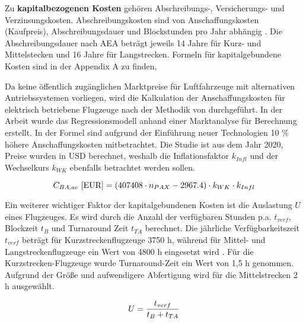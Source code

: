 Zu \textbf{kapitalbezogenen Kosten} gehören Abschreibungs-, Versicherungs- und Verzinsungskosten. 
Abschreibungskosten sind von Anschaffungskosten (Kaufpreis), Abschreibungsdauer und Blockstunden pro Jahr abhängig \cite{conrady2019luftverkehr}.
Die Abschreibungsdauer nach AEA beträgt jeweils 14 Jahre für Kurz- und Mittelstecken und 16 Jahre für Langstrecken.
Formeln für kapitalgebundene Kosten sind in der Appendix A zu finden,

Da keine öffentlich zugänglichen Marktpreise für Luftfahrzeuge mit alternativen Antriebssystemen vorliegen, 
wird die Kalkulation der Anschaffungskosten für elektrisch betriebene Flugzeuge nach der Methodik von \cite{monjon2020conceptual} durchgeführt. 
In der Arbeit wurde das Regressionsmodell anhand einer Marktanalyse für Berechnung erstellt. 
In der Formel sind aufgrund der Einführung neuer Technologien 10 \% höhere Anschaffungskosten mitbetrachtet. 
Die Studie ist aus dem Jahr 2020, Preise wurden in USD berechnet, weshalb die Inflationsfaktor $k_{Infl}$ und
der Wechselkurs $k_{WK}$ ebenfalls betrachtet werden sollen.

\begin{equation}
   {C_{BA,ac} ~[\text{EUR}]} = (407408 \cdot n_{PAX} - 2967.4) \cdot k_{WK} \cdot {k_{Infl}}\\
   \label{price BA}
\end{equation}

Ein weiterer wichtiger Faktor der kapitalgebundenen Kosten ist die Auslastung $U$ eines Flugzeuges. Es wird durch die Anzahl 
der verfügbaren Stunden p.a. $t_{verf}$, Blockzeit $t_B$ und Turnaround Zeit $t_{TA}$ berechnet. 
Die jährliche Verfügbarkeitszeit $t_{verf}$ beträgt für Kurzstreckenflugzeuge 3750 h, 
während für Mittel- und Langstreckenflugzeuge ein Wert von 4800 h eingesetzt wird \cite{scholz_design_evaluation_doc}. Für die Kurzstrecken-Flugzeuge 
wurde Turnaround-Zeit ein Wert von 1,5 h genommen. Aufgrund der Größe und aufwendigere Abfertigung wird für die Mittelstrecken 2 h ausgewählt.

\begin{equation}
   U = \frac{t_{verf}}{t_B + t_{TA}} \\
   \label{utilisation}
\end{equation}

